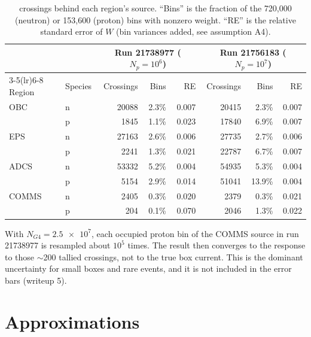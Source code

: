 \begin{table}[h]
\centering
\caption{\mcdc{} crossings behind each region's \gfour{} source. ``Bins'' is the fraction of the 720,000 (neutron) or 153,600 (proton) bins with nonzero weight. ``RE'' is the \mcdc{} relative standard error of $W$ (bin variances added, see assumption A4).}
\label{tab:crossings}
\begin{tabular}{ll rrr rrr}
\toprule
 & & \multicolumn{3}{c}{Run 21738977 ($N_p=10^6$)} & \multicolumn{3}{c}{Run 21756183 ($N_p=10^7$)} \\
\cmidrule(lr){3-5}\cmidrule(lr){6-8}
Region & Species & Crossings & Bins & RE & Crossings & Bins & RE \\
\midrule
OBC   & n & \num{20088} & 2.3\% & 0.007 & \num{20415} & 2.3\% & 0.007 \\
      & p & \num{1845}  & 1.1\% & 0.023 & \num{17840} & 6.9\% & 0.007 \\
EPS   & n & \num{27163} & 2.6\% & 0.006 & \num{27735} & 2.7\% & 0.006 \\
      & p & \num{2241}  & 1.3\% & 0.021 & \num{22787} & 6.7\% & 0.007 \\
ADCS  & n & \num{53332} & 5.2\% & 0.004 & \num{54935} & 5.3\% & 0.004 \\
      & p & \num{5154}  & 2.9\% & 0.014 & \num{51041} & 13.9\% & 0.004 \\
COMMS & n & \num{2405}  & 0.3\% & 0.020 & \num{2379}  & 0.3\% & 0.021 \\
      & p & \num{204}   & 0.1\% & 0.070 & \num{2046}  & 1.3\% & 0.022 \\
\bottomrule
\end{tabular}
\end{table}

With $N_{G4}=\num{2.5e7}$, each occupied proton bin of the COMMS source in run 21738977 is resampled about $10^5$ times. The \gfour{} result then converges to the response to those $\sim$200 tallied crossings, not to the true box current. This is the dominant uncertainty for small boxes and rare events, and it is not included in the \gfour{} error bars (writeup 5).

\section{Approximations}


